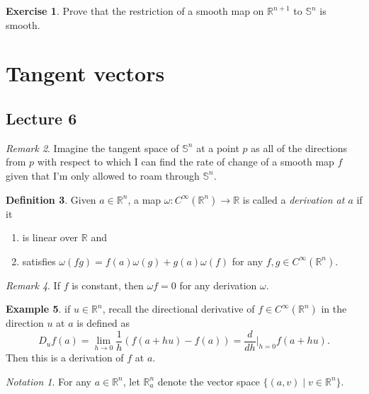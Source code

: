 \documentclass[10pt,letterpaper,cm]{nupset}
\theoremstyle{definition}
\newtheorem{definition}{Definition}[subsection]
\newtheorem{exmp}[definition]{Example}
\theoremstyle{theorem}
\newtheorem{exercise}[definition]{Exercise}
\theoremstyle{remark}
\newtheorem{remark}[definition]{Remark}
\newtheorem*{notation}{Notation}
\newcommand{\R}{\mathbb R}
\renewcommand{\S}{\mathbb S}
\newcommand{\1}{\mathbf{1}}
\newcommand{\0}{\vec 0}
\begin{document}
\begin{exercise}
Prove that the restriction of a smooth map on $\R^{n+1}$ to $\S^n$ is smooth. 
\end{exercise}

\section{Tangent vectors}

\subsection{Lecture 6}

\begin{remark}
Imagine the tangent space of $\S^n$ at a point $p$ as all of the directions from $p$ with respect to which I can find the rate of change of a smooth map $f$ given that I'm only allowed to roam through $\S^n$. 
\end{remark}


\begin{definition}
Given $a \in \R^n$, a map $\omega: C^{\infty}(\R^n) \to \R$ is called a \textit{derivation at $a$} if it
\begin{enumerate}[label=\alph*.]
\item is linear over $\R$ and 
\item satisfies $\omega(fg) = f(a)\omega(g) + g(a) \omega(f)$ for any $f, g \in C^{\infty}(\R^n)$. 
\end{enumerate}
\end{definition}

\begin{remark}
If $f$ is constant, then $\omega f =0$ for any derivation $\omega$.
\end{remark}

\begin{exmp}
if $u \in \R^n$, recall the directional derivative of $f\in C^{\infty}(\R^n)$ in the direction $u$ at $a$ is defined as $$D_uf(a) = \lim_{h \to 0} \frac{1}{h}(f(a+hu) -f(a)) = \frac{d}{d{h}}\bigr\rvert_{h=0} f(a+hu).$$ Then this is a derivation of $f$ at $a$. 
\end{exmp}

\begin{notation}
For any $a\in \R^n$, let $\R_a^n$ denote the vector space $\{\left(a,v\right) \mid v \in \R^n\}$.
\end{notation}
\end{document}

